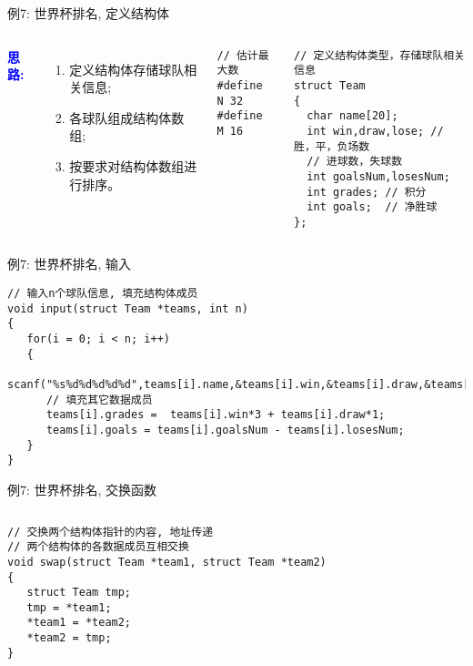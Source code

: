\begin{frame}{例7: 世界杯排名, 定义结构体}
\begin{columns}[T]
\textbf{\textcolor{blue}{思路:}}
\begin{enumerate}
	\item 定义结构体存储球队相关信息;
	\item 各球队组成结构体数组;
	\item 按要求对结构体数组进行排序。
\end{enumerate}
\begin{lstlisting}
// 估计最大数 
#define N 32
#define M 16
\end{lstlisting}
\begin{lstlisting}
// 定义结构体类型，存储球队相关信息 
struct Team
{
  char name[20];
  int win,draw,lose; // 胜，平，负场数 
  // 进球数，失球数
  int goalsNum,losesNum; 
  int grades; // 积分
  int goals;  // 净胜球  
};
\end{lstlisting}
\end{columns}
\end{frame}

\begin{frame}{例7: 世界杯排名, 输入}
\begin{lstlisting}
// 输入n个球队信息, 填充结构体成员
void input(struct Team *teams, int n)
{
   for(i = 0; i < n; i++)
   {
      scanf("%s%d%d%d%d%d",teams[i].name,&teams[i].win,&teams[i].draw,&teams[i].lose,&teams[i].goalsNum,&teams[i].losesNum);
      // 填充其它数据成员
      teams[i].grades =  teams[i].win*3 + teams[i].draw*1;
      teams[i].goals = teams[i].goalsNum - teams[i].losesNum; 
   }
}
\end{lstlisting}
\end{frame}

\begin{frame}{例7: 世界杯排名, 交换函数}
\begin{columns}[T]
\begin{lstlisting}
// 交换两个结构体指针的内容, 地址传递
// 两个结构体的各数据成员互相交换 
void swap(struct Team *team1, struct Team *team2)
{
   struct Team tmp;
   tmp = *team1; 
   *team1 = *team2; 
   *team2 = tmp;
}
\end{lstlisting}
\end{columns}
\medskip
\end{frame}

